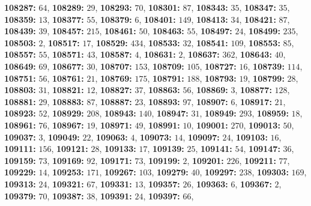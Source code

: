 \textsf{\bfseries 108287:} $64$, \textsf{\bfseries 108289:} $29$, \textsf{\bfseries 108293:} $70$, \textsf{\bfseries 108301:} $87$, \textsf{\bfseries 108343:} $35$, \textsf{\bfseries 108347:} $35$, \textsf{\bfseries 108359:} $13$, \textsf{\bfseries 108377:} $55$, \textsf{\bfseries 108379:} $6$, \textsf{\bfseries 108401:} $149$, \textsf{\bfseries 108413:} $34$, \textsf{\bfseries 108421:} $87$, \textsf{\bfseries 108439:} $39$, \textsf{\bfseries 108457:} $215$, \textsf{\bfseries 108461:} $50$, \textsf{\bfseries 108463:} $55$, \textsf{\bfseries 108497:} $24$, \textsf{\bfseries 108499:} $235$, \textsf{\bfseries 108503:} $2$, \textsf{\bfseries 108517:} $17$, \textsf{\bfseries 108529:} $434$, \textsf{\bfseries 108533:} $32$, \textsf{\bfseries 108541:} $109$, \textsf{\bfseries 108553:} $85$, \textsf{\bfseries 108557:} $55$, \textsf{\bfseries 108571:} $43$, \textsf{\bfseries 108587:} $4$, \textsf{\bfseries 108631:} $2$, \textsf{\bfseries 108637:} $362$, \textsf{\bfseries 108643:} $40$, \textsf{\bfseries 108649:} $69$, \textsf{\bfseries 108677:} $30$, \textsf{\bfseries 108707:} $153$, \textsf{\bfseries 108709:} $105$, \textsf{\bfseries 108727:} $16$, \textsf{\bfseries 108739:} $114$, \textsf{\bfseries 108751:} $56$, \textsf{\bfseries 108761:} $21$, \textsf{\bfseries 108769:} $175$, \textsf{\bfseries 108791:} $188$, \textsf{\bfseries 108793:} $19$, \textsf{\bfseries 108799:} $28$, \textsf{\bfseries 108803:} $31$, \textsf{\bfseries 108821:} $12$, \textsf{\bfseries 108827:} $37$, \textsf{\bfseries 108863:} $56$, \textsf{\bfseries 108869:} $3$, \textsf{\bfseries 108877:} $128$, \textsf{\bfseries 108881:} $29$, \textsf{\bfseries 108883:} $87$, \textsf{\bfseries 108887:} $23$, \textsf{\bfseries 108893:} $97$, \textsf{\bfseries 108907:} $6$, \textsf{\bfseries 108917:} $21$, \textsf{\bfseries 108923:} $52$, \textsf{\bfseries 108929:} $208$, \textsf{\bfseries 108943:} $140$, \textsf{\bfseries 108947:} $31$, \textsf{\bfseries 108949:} $293$, \textsf{\bfseries 108959:} $18$, \textsf{\bfseries 108961:} $76$, \textsf{\bfseries 108967:} $19$, \textsf{\bfseries 108971:} $49$, \textsf{\bfseries 108991:} $10$, \textsf{\bfseries 109001:} $270$, \textsf{\bfseries 109013:} $50$, \textsf{\bfseries 109037:} $3$, \textsf{\bfseries 109049:} $22$, \textsf{\bfseries 109063:} $4$, \textsf{\bfseries 109073:} $14$, \textsf{\bfseries 109097:} $24$, \textsf{\bfseries 109103:} $16$, \textsf{\bfseries 109111:} $156$, \textsf{\bfseries 109121:} $28$, \textsf{\bfseries 109133:} $17$, \textsf{\bfseries 109139:} $25$, \textsf{\bfseries 109141:} $54$, \textsf{\bfseries 109147:} $36$, \textsf{\bfseries 109159:} $73$, \textsf{\bfseries 109169:} $92$, \textsf{\bfseries 109171:} $73$, \textsf{\bfseries 109199:} $2$, \textsf{\bfseries 109201:} $226$, \textsf{\bfseries 109211:} $77$, \textsf{\bfseries 109229:} $14$, \textsf{\bfseries 109253:} $171$, \textsf{\bfseries 109267:} $103$, \textsf{\bfseries 109279:} $40$, \textsf{\bfseries 109297:} $238$, \textsf{\bfseries 109303:} $169$, \textsf{\bfseries 109313:} $24$, \textsf{\bfseries 109321:} $67$, \textsf{\bfseries 109331:} $13$, \textsf{\bfseries 109357:} $26$, \textsf{\bfseries 109363:} $6$, \textsf{\bfseries 109367:} $2$, \textsf{\bfseries 109379:} $70$, \textsf{\bfseries 109387:} $38$, \textsf{\bfseries 109391:} $24$, \textsf{\bfseries 109397:} $66$, 
